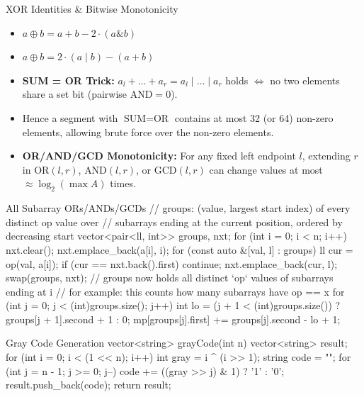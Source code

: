 \documentclass[10pt]{article}
\newcommand{\complexity}[1]{%
  \tcbox[on line,
    colback=tagbg,
    colframe=tagbg,
    boxrule=0pt,
    arc=2pt,
    boxsep=0pt,
    left=3.5pt, right=3.5pt, top=1.5pt, bottom=1.5pt
  ]{\color{tagtext}\scriptsize\bfseries\ensuremath{#1}}%
}
\begin{document}
\begin{conceptbox}{XOR Identities \& Bitwise Monotonicity}
    \begin{itemize}
        \item $a \oplus b = a + b - 2 \cdot (a \mathbin{\&} b)$
        \item $a \oplus b = 2 \cdot (a \mathbin{|} b) - (a + b)$
        \item \textbf{SUM = OR Trick:} $a_l + \dots + a_r = a_l \mid \dots \mid a_r$ holds $\iff$ no two elements share a set bit (pairwise $\text{AND} = 0$).
        \item Hence a segment with $\text{SUM} = \text{OR}$ contains at most 32 (or 64) non-zero elements, allowing brute force over the non-zero elements.
        \item \textbf{OR/AND/GCD Monotonicity:} For any fixed left endpoint $l$, extending $r$ in $\text{OR}(l, r)$, $\text{AND}(l, r)$, or $\text{GCD}(l, r)$ can change values at most $\approx \log_2(\max A)$ times.
    \end{itemize}
\end{conceptbox}

\begin{vscode}{All Subarray ORs/ANDs/GCDs \complexity{O(N \log (\max A))}}
// groups: (value, largest start index) of every distinct op value over
// subarrays ending at the current position, ordered by decreasing start
vector<pair<ll, int>> groups, nxt;
for (int i = 0; i < n; i++)
{
    nxt.clear();
    nxt.emplace_back(a[i], i);
    for (const auto &[val, l] : groups)
    {
        ll cur = op(val, a[i]);
        if (cur == nxt.back().first)
            continue;
        nxt.emplace_back(cur, l);
    }
    swap(groups, nxt);
    // groups now holds all distinct `op` values of subarrays ending at i
    // for example: this counts how many subarrays have op == x
    for (int j = 0; j < (int)groups.size(); j++)
    {
        int lo = (j + 1 < (int)groups.size()) ? groups[j + 1].second + 1 : 0;
        mp[groups[j].first] += groups[j].second - lo + 1;
    }
}
\end{vscode}

\newpage
\begin{vscode}{Gray Code Generation \complexity{O(N \cdot 2^N)}}
vector<string> grayCode(int n)
{
    vector<string> result;
    for (int i = 0; i < (1 << n); i++)
    {
        int gray = i ^ (i >> 1);
        string code = "";
        for (int j = n - 1; j >= 0; j--)
            code += ((gray >> j) & 1) ? '1' : '0';
        result.push_back(code);
    }
    return result;
}
\end{vscode}
\end{document}
